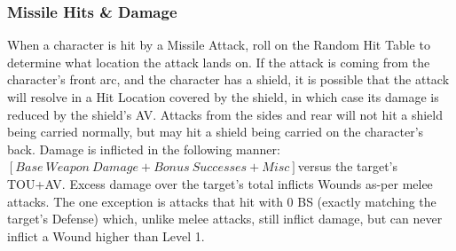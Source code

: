 \documentclass[oneside,11pt,english]{book}
\begin{document}
\subsubsection{Missile Hits \& Damage}
When a character is hit by a Missile Attack, roll on the Random Hit Table to determine what location the
attack lands on. If the attack is coming from the character’s front arc, and the character has a shield, it is
possible that the attack will resolve in a Hit Location covered by the shield, in which case its damage is
reduced by the shield’s AV. Attacks from the sides and rear will not hit a shield being carried normally,
but may hit a shield being carried on the character’s back.
Damage is inflicted in the following manner: $ [Base~Weapon~Damage+Bonus~Successes+Misc] $versus the
target’s TOU+AV. Excess damage over the target’s total inflicts Wounds as-per melee attacks. The one
exception is attacks that hit with 0 BS (exactly matching the target’s Defense) which, unlike melee
attacks, still inflict damage, but can never inflict a Wound higher than Level 1.
\end{document}
